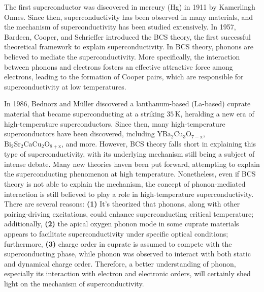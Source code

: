 \documentclass[11pt]{article}
\begin{document}
The first superconductor was discovered in mercury (Hg) in 1911 by Kamerlingh Onnes. Since then, superconductivity has been observed in many materials, and the mechanism of superconductivity has been studied extensively. In 1957, Bardeen, Cooper, and Schrieffer introduced the BCS theory, the first successful theoretical framework to explain superconductivity\cite{bardeen_theory_1957}. In BCS theory, phonons are believed to mediate the superconductivity. More specifically, the interaction between phonons and electrons fosters an effective attractive force among electrons, leading to the formation of Cooper pairs, which are responsible for superconductivity at low temperatures\cite{bardeen_theory_1957}. 

In 1986, Bednorz and Müller discovered a lanthanum-based (La-based) cuprate material that became superconducting at a striking $35\,\mathrm{K}$\cite{bednorz_possible_1986}, heralding a new era of high-temperature superconductors. Since then, many  high-temperature superconductors have been discovered, including $\mathrm{YBa_{2}Cu_{3}O_{7-x}}$\cite{wu_superconductivity_1987}, $\mathrm{Bi_2Sr_2CaCu_{2}O_{8+x}}$\cite{maeda_a_1988}, and more. However, BCS theory falls short in explaining this type of superconductivity, with its underlying mechanism still being a subject of intense debate. Many new theories haven been put forward, attempting to explain the superconducting phenomenon at high temperature. Nonetheless, even if BCS theory is not able to explain the mechanism, the concept of phonon-mediated interaction is still believed to play a role in high-temperature superconductivity. There are several reasons: \textbf{(1)} It's theorized that phonons, along with other pairing-driving excitations, could enhance superconducting critical temperature\cite{braicovich_determining_2020}; additionally, \textbf{(2)} the apical oxygen phonon mode in some cuprate materials appears to facilitate superconductivity under specific optical conditions\cite{kaiser_optically_2014}; furthermore, \textbf{(3)} charge order in cuprate is assumed to compete with the superconducting phase, while phonon was observed to interact with both static and dynamical charge order\cite{arpaia_charge_2021,comin_resonant_2016,canosa_resonant_2014, hucker_competing_2014, chang_direct_2012,ghiringhelli_long-range_2012,wang_charge_2021,lin_strongly_2020, huang_quantum_2021,miao_incommensurate_2018,tacon_inelastic_2014,li_multiorbital_2020,braicovich_determining_2020,chaix_dispersive_2017,peng_enhanced_2020}. Therefore, a better understanding of phonon, especially its interaction with electron and electronic orders, will certainly shed light on the mechanism of superconductivity.  
\end{document}

